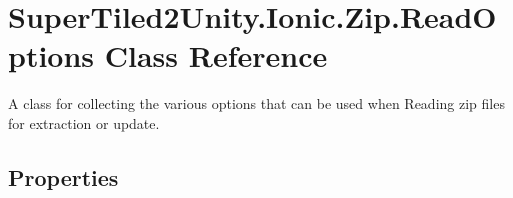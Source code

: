 \hypertarget{class_super_tiled2_unity_1_1_ionic_1_1_zip_1_1_read_options}{}\section{Super\+Tiled2\+Unity.\+Ionic.\+Zip.\+Read\+Options Class Reference}
\label{class_super_tiled2_unity_1_1_ionic_1_1_zip_1_1_read_options}


A class for collecting the various options that can be used when Reading zip files for extraction or update.  


\subsection*{Properties}
